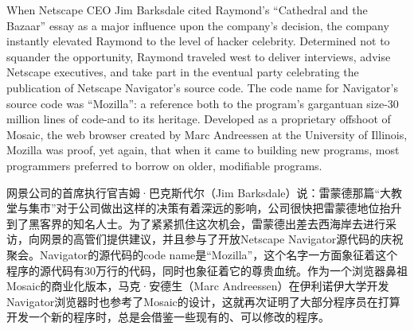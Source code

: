\ifdefined\eng
When Netscape CEO Jim Barksdale cited Raymond's ``Cathedral and the Bazaar'' essay as a major influence upon the company's decision, the company instantly elevated Raymond to the level of hacker celebrity. Determined not to squander the opportunity, Raymond traveled west to deliver interviews, advise Netscape executives, and take part in the eventual party celebrating the publication of Netscape Navigator's source code. The code name for Navigator's source code was ``Mozilla'': a reference both to the program's gargantuan size-30 million lines of code-and to its heritage. Developed as a proprietary offshoot of Mosaic, the web browser created by Marc Andreessen at the University of Illinois, Mozilla was proof, yet again, that when it came to building new programs, most programmers preferred to borrow on older, modifiable programs.
\fi

\ifdefined\chs
网景公司的首席执行官吉姆·巴克斯代尔（Jim Barksdale）说：雷蒙德那篇``大教堂与集市''对于公司做出这样的决策有着深远的影响，公司很快把雷蒙德地位抬升到了黑客界的知名人士。为了紧紧抓住这次机会，雷蒙德出差去西海岸去进行采访，向网景的高管们提供建议，并且参与了开放Netscape Navigator源代码的庆祝聚会。Navigator的源代码的code name是``Mozilla''，这个名字一方面象征着这个程序的源代码有30万行的代码，同时也象征着它的尊贵血统。作为一个浏览器鼻祖Mosaic的商业化版本，马克·安德生（Marc Andreessen）在伊利诺伊大学开发Navigator浏览器时也参考了Mosaic的设计，这就再次证明了大部分程序员在打算开发一个新的程序时，总是会借鉴一些现有的、可以修改的程序。
\fi



